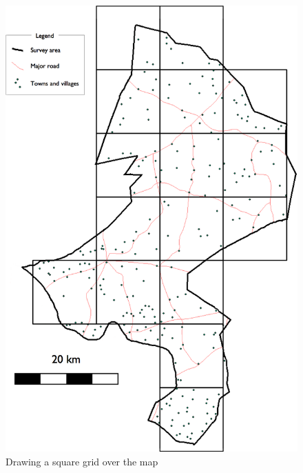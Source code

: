 \documentclass[12pt,a4paper]{book}
\theoremstyle{definition}
\theoremstyle{definition}
\theoremstyle{definition}
\theoremstyle{remark}
\begin{document}
\begin{figure}[H]

{\centering \includegraphics[width=800pt]{figures/mapSample2} 

}

\caption{Drawing a square grid over the map}\label{fig:sample6}
\end{figure}
\end{document}

